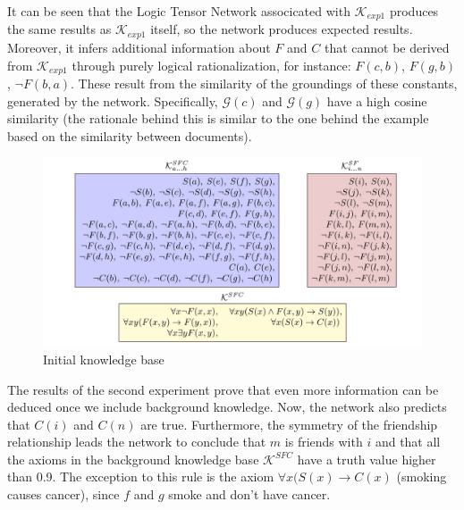 \documentclass{article}
\begin{document}
It can be seen that the Logic Tensor Network associcated with $\mathcal{K}_{exp1}$ produces the same results as $\mathcal{K}_{exp1}$ itself, so the network produces expected results. Moreover, it infers additional information about $F$ and $C$ that cannot be derived from $\mathcal{K}_{exp1}$ through purely logical rationalization, for instance: $F(c, b)$, $F(g, b)$, $\neg F(b, a)$. These result from the similarity of the groundings of these constants, generated by the network. Specifically, $\mathcal{G}(c)$ and $\mathcal{G}(g)$ have a high cosine similarity (the rationale behind this is similar to the one behind the example based on the similarity between documents).\\

\begin{figure}[H]
	\includegraphics[scale=0.2]{kb}
	\caption{Initial knowledge base \cite{LTN}}
\end{figure}

The results of the second experiment prove that even more information can be deduced once we include background knowledge. Now, the network also predicts that $C(i)$ and $C(n)$ are true. Furthermore, the symmetry of the friendship relationship leads the network to conclude that $m$ is friends with $i$ and that all the axioms in the background knowledge base $\mathcal{K}^{SFC}$ have a truth value higher than 0.9. The exception to this rule is the axiom $\forall x (S(x) \rightarrow C(x)$ (smoking causes cancer), since $f$ and $g$ smoke and don't have cancer. \cite{LTN}
\end{document}
